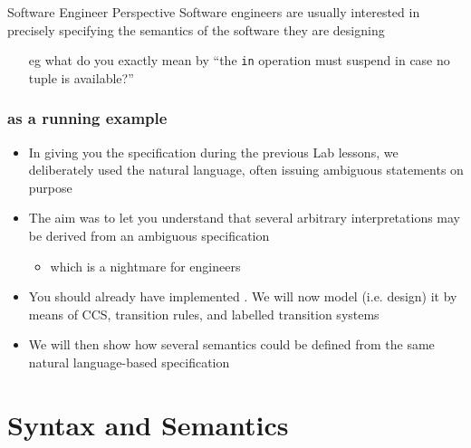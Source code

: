 \documentclass[presentation]{beamer}\mode<presentation>{\usetheme{AMSCesenaPurpleAndGold}}
\begin{document}
\begin{frame}[allowframebreaks]
        \bigskip

        \begin{block}{Software Engineer Perspective}
            Software engineers are usually interested in precisely specifying the \alert{semantics} of the software they are designing
            \begin{itemize}
                \item[eg] what do you exactly mean by ``the \texttt{in} operation must suspend in case no tuple is available?''
            \end{itemize}
        \end{block}
\end{frame}

\begin{frame}%
    \frametitle{\linda{} as a running example}

    \begin{itemize}
        \item In giving you the \linda{} specification during the previous Lab lessons, we deliberately used the natural language, often issuing \alert{ambiguous} statements on purpose
        
        \vfill
        
        \item The aim was to let you understand that several arbitrary \alert{interpretations} may be derived from an ambiguous specification
        \begin{itemize}
            \item which is a nightmare for engineers
        \end{itemize}
        
        \vfill
        
        \item You should already have implemented \linda{}. We will now \alert{model} (i.e. design) it by means of CCS, transition rules, and labelled transition systems
        
        \vfill
        
        \item We will then show how several semantics could be defined from the same natural language-based specification 
    \end{itemize}
    
\end{frame}

\section{Syntax and Semantics}
\end{document}
